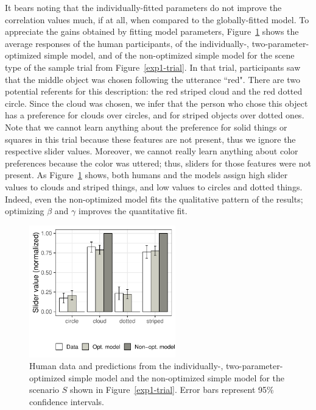 \documentclass[11pt,a4paper]{article}
\begin{document}
It bears noting that the individually-fitted parameters do not improve the correlation values much, if at all, when compared to the globally-fitted model.
To appreciate the gains obtained by fitting model parameters, Figure~\ref{barplot_x4} shows the average responses of the human participants, of the individually-, two-parameter-optimized simple model, and of the non-optimized simple model for the scene type of the sample trial from Figure~\ref{exp1-trial}.
In that trial, participants saw that the middle object was chosen following the utterance ``red". There are two potential referents for this description: the red striped cloud and the red dotted circle. Since the cloud was chosen, we infer that the person who chose this object has a preference for clouds over circles, and for striped objects over dotted ones. 
Note that we cannot learn anything about the preference for solid things or squares in this trial because these features are not present, thus we ignore the respective slider values. 
Moreover, we cannot really learn anything about color preferences because the color was uttered; thus, sliders for those features were not present.  
As Figure~\ref{barplot_x4} shows, both humans and the models assign high slider values to clouds and striped things, and low values to circles and dotted things. Indeed, even the non-optimized model fits the qualitative pattern of the results; optimizing $\beta$ and $\gamma$ improves the quantitative fit.


\begin{figure}[ht!]
	\centering
	\includegraphics[width=2.5in]{images/december_barplot_x4.pdf}
	\caption{Human data and predictions from the individually-, two-parameter-optimized simple model and the non-optimized simple model for the scenario $S$ shown in Figure~\ref{exp1-trial}. Error bars represent 95\% confidence intervals.}\label{barplot_x4}
\end{figure}
\end{document}
